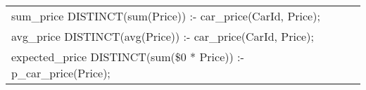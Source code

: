 \begin{tabular}{lcl}
sum\_price DISTINCT(sum(Price)) :- car\_price(CarId, Price);\\
avg\_price DISTINCT(avg(Price)) :- car\_price(CarId, Price);\\
expected\_price DISTINCT(sum(\$0 * Price)) :- p\_car\_price(Price);\\
\end{tabular}
